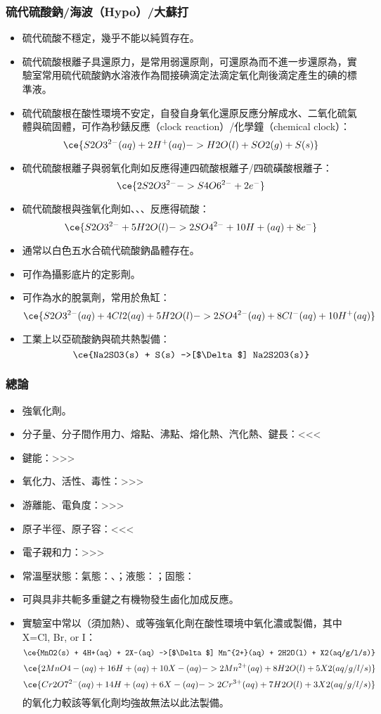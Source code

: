 \documentclass[a4paper,12pt]{report}
\begin{document}
\subsubsection{硫代硫酸鈉/海波（Hypo）/大蘇打}
\begin{itemize}
\item 硫代硫酸不穩定，幾乎不能以純質存在。
\item 硫代硫酸根離子具還原力，是常用弱還原劑，可還原為而不進一步還原為，實驗室常用硫代硫酸鈉水溶液作為間接碘滴定法滴定氧化劑後滴定產生的碘的標準液。
\item 硫代硫酸根在酸性環境不安定，自發自身氧化還原反應分解成水、二氧化硫氣體與硫固體，可作為秒錶反應（clock reaction）/化學鐘（chemical clock）：
\[\ce{S2O3^{2-}(aq) + 2H^+(aq) -> H2O(l) + SO2(g) + S(s)}\]
\item 硫代硫酸根離子與弱氧化劑如反應得連四硫酸根離子/四硫磺酸根離子：
\[\ce{2S2O3^{2-} -> S4O6^{2-} + 2e^-}\]
\item 硫代硫酸根與強氧化劑如、、、反應得硫酸：
\[\ce{S2O3^{2-} + 5H2O(l) -> 2SO4^{2-} + 10H+(aq) + 8e^-}\]
\item 通常以白色五水合硫代硫酸鈉晶體存在。
\item 可作為攝影底片的定影劑。
\item 可作為水的脫氯劑，常用於魚缸：
\[\ce{S2O3^{2-}(aq) + 4Cl2(aq) + 5H2O(l) -> 2SO4^{2-}(aq) + 8Cl^-(aq) + 10H^+(aq)}\]
\item 工業上以亞硫酸鈉與硫共熱製備：
\[\ce{Na2SO3(s) + S(s) ->[$\Delta$] Na2S2O3(s)}\]
\end{itemize}
\subsubsection{總論}
\begin{itemize}
\item 強氧化劑。
\item 分子量、分子間作用力、熔點、沸點、熔化熱、汽化熱、鍵長：<<<
\item 鍵能：>>>
\item 氧化力、活性、毒性：>>>
\item 游離能、電負度：>>>
\item 原子半徑、原子容：<<<
\item 電子親和力：>>>
\item 常溫壓狀態：氣態：、；液態：；固態：
\item 可與具非共軛多重鍵之有機物發生鹵化加成反應。
\item 實驗室中常以（須加熱）、或等強氧化劑在酸性環境中氧化濃或製備，其中 X=Cl, Br, or I：
\[\ce{MnO2(s) + 4H+(aq) + 2X-(aq) ->[$\Delta$] Mn^{2+}(aq) + 2H2O(l) + X2(aq/g/l/s)}\]
\[\ce{2MnO4-(aq) + 16H+(aq) + 10X-(aq) -> 2Mn^{2+}(aq) + 8H2O(l) + 5X2(aq/g/l/s)}\]
\[\ce{Cr2O7^{2-}(aq) + 14H+(aq) + 6X-(aq) -> 2Cr^{3+}(aq) + 7H2O(l) + 3X2(aq/g/l/s)}\]
的氧化力較該等氧化劑均強故無法以此法製備。
\end{itemize}
\end{document}
